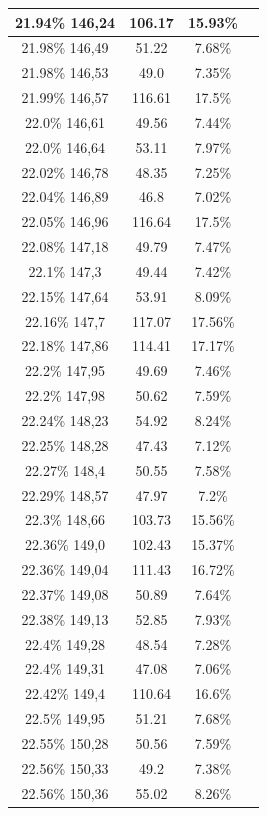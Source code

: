 \begin{center}
\begin{longtable}{|c|c|c|c|}
21.94\% 146,24 & 106.17 & 15.93\%  \\ \hline
21.98\% 146,49 & 51.22 & 7.68\%  \\ \hline
21.98\% 146,53 & 49.0 & 7.35\%  \\ \hline
21.99\% 146,57 & 116.61 & 17.5\%  \\ \hline
22.0\% 146,61 & 49.56 & 7.44\%  \\ \hline
22.0\% 146,64 & 53.11 & 7.97\%  \\ \hline
22.02\% 146,78 & 48.35 & 7.25\%  \\ \hline
22.04\% 146,89 & 46.8 & 7.02\%  \\ \hline
22.05\% 146,96 & 116.64 & 17.5\%  \\ \hline
22.08\% 147,18 & 49.79 & 7.47\%  \\ \hline
22.1\% 147,3 & 49.44 & 7.42\%  \\ \hline
22.15\% 147,64 & 53.91 & 8.09\%  \\ \hline
22.16\% 147,7 & 117.07 & 17.56\%  \\ \hline
22.18\% 147,86 & 114.41 & 17.17\%  \\ \hline
22.2\% 147,95 & 49.69 & 7.46\%  \\ \hline
22.2\% 147,98 & 50.62 & 7.59\%  \\ \hline
22.24\% 148,23 & 54.92 & 8.24\%  \\ \hline
22.25\% 148,28 & 47.43 & 7.12\%  \\ \hline
22.27\% 148,4 & 50.55 & 7.58\%  \\ \hline
22.29\% 148,57 & 47.97 & 7.2\%  \\ \hline
22.3\% 148,66 & 103.73 & 15.56\%  \\ \hline
22.36\% 149,0 & 102.43 & 15.37\%  \\ \hline
22.36\% 149,04 & 111.43 & 16.72\%  \\ \hline
22.37\% 149,08 & 50.89 & 7.64\%  \\ \hline
22.38\% 149,13 & 52.85 & 7.93\%  \\ \hline
22.4\% 149,28 & 48.54 & 7.28\%  \\ \hline
22.4\% 149,31 & 47.08 & 7.06\%  \\ \hline
22.42\% 149,4 & 110.64 & 16.6\%  \\ \hline
22.5\% 149,95 & 51.21 & 7.68\%  \\ \hline
22.55\% 150,28 & 50.56 & 7.59\%  \\ \hline
22.56\% 150,33 & 49.2 & 7.38\%  \\ \hline
22.56\% 150,36 & 55.02 & 8.26\%  \\ \hline

\end{longtable}
\end{center}

